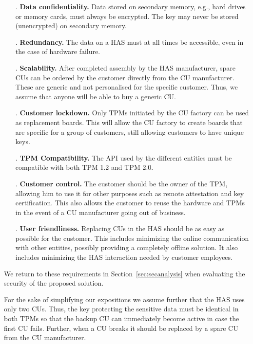 {\begin{itemize}
\item[\namedlabel{Rsecurity}{R1}.] \textbf{Data confidentiality.} Data stored on secondary memory, e.g., hard drives or memory cards, must always be encrypted. The key may never be stored (unencrypted) on secondary memory.
\item[\namedlabel{Rredund}{R2}.] \textbf{Redundancy.} The data on a HAS must at all times be accessible, even in the case of hardware failure.
\item[\namedlabel{Rscale}{R3}.] \textbf{Scalability.} After completed assembly by the HAS manufacturer, spare CUs can be ordered by the customer directly from the CU manufacturer. These are generic and not personalised for the specific customer. Thus, we assume that anyone will be able to buy a generic CU.
\item[\namedlabel{RcustLock}{R4}.] \textbf{Customer lockdown.} Only TPMs initiated by the CU factory can be used as replacement boards. This will allow the CU factory to create boards that are specific for a group of customers, still allowing customers to have unique keys.
\item[\namedlabel{Rpers}{R5}.] \textbf{TPM Compatibility.} The API used by the different entities must be compatible with both TPM 1.2 and TPM 2.0.
\item[\namedlabel{RcustControl}{R6}.] \textbf{Customer control.} The customer should be the owner of the TPM, allowing him to use it for other purposes such as remote attestation and key certification. This also allows the customer to reuse the hardware and TPMs in the event of a CU manufacturer going out of business.
\item[\namedlabel{RuserF}{R7}.] \textbf{User friendliness.} Replacing CUs in the HAS should be as easy as possible for the customer. This includes minimizing the online communication with other entities, possibly providing a completely offline solution. It also includes minimizing the HAS interaction needed by customer employees.
\end{itemize}

We return to these requirements in Section~\ref{sec:secanalysis} when evaluating the security of the proposed solution.


For the sake of simplifying our expositions we assume further that the HAS uses only two CUs. Thus, the key protecting the sensitive data must be identical in both TPMs so that the backup CU can immediately become active in case the first CU fails. Further, when a CU breaks it should be replaced by a spare CU from the CU manufacturer.

}
